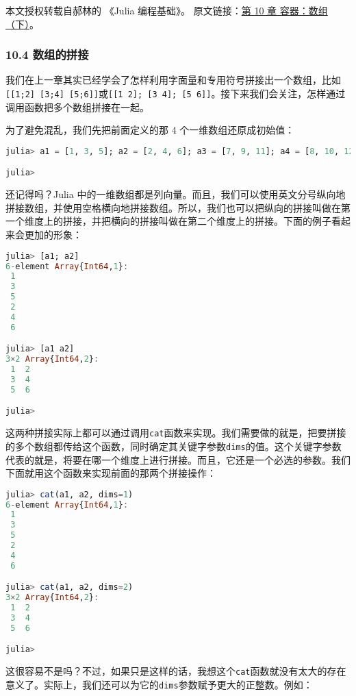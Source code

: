 
本文授权转载自郝林的 《Julia 编程基础》。 原文链接：\href{https://github.com/hyper0x/JuliaBasics/blob/master/book/ch10.md}{第 10 章 容器：数组（下）}。


\subsubsection{10.4 数组的拼接}

我们在上一章其实已经学会了怎样利用字面量和专用符号拼接出一个数组，比如\verb|[[1;2] [3;4] [5;6]]|或\verb|[[1 2]; [3 4]; [5 6]]|。接下来我们会关注，怎样通过调用函数把多个数组拼接在一起。

为了避免混乱，我们先把前面定义的那 4 个一维数组还原成初始值：

\begin{lstlisting}[language=julia]
julia> a1 = [1, 3, 5]; a2 = [2, 4, 6]; a3 = [7, 9, 11]; a4 = [8, 10, 12];

julia>
\end{lstlisting}

还记得吗？Julia 中的一维数组都是列向量。而且，我们可以使用英文分号纵向地拼接数组，并使用空格横向地拼接数组。所以，我们也可以把纵向的拼接叫做在第一个维度上的拼接，并把横向的拼接叫做在第二个维度上的拼接。下面的例子看起来会更加的形象：

\begin{lstlisting}[language=julia]
julia> [a1; a2]
6-element Array{Int64,1}:
 1
 3
 5
 2
 4
 6

julia> [a1 a2]
3×2 Array{Int64,2}:
 1  2
 3  4
 5  6

julia> 
\end{lstlisting}

这两种拼接实际上都可以通过调用\verb|cat|函数来实现。我们需要做的就是，把要拼接的多个数组都传给这个函数，同时确定其关键字参数\verb|dims|的值。这个关键字参数代表的就是，将要在哪一个维度上进行拼接。而且，它还是一个必选的参数。我们下面就用这个函数来实现前面的那两个拼接操作：

\begin{lstlisting}[language=julia]
julia> cat(a1, a2, dims=1)
6-element Array{Int64,1}:
 1
 3
 5
 2
 4
 6

julia> cat(a1, a2, dims=2)
3×2 Array{Int64,2}:
 1  2
 3  4
 5  6

julia> 
\end{lstlisting}

这很容易不是吗？不过，如果只是这样的话，我想这个\verb|cat|函数就没有太大的存在意义了。实际上，我们还可以为它的\verb|dims|参数赋予更大的正整数。例如：

